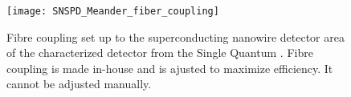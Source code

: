 \begin{figure}[H]
    \centering
    \texttt{[image: SNSPD\_Meander\_fiber\_coupling]}
    \caption{Fibre coupling set up to the superconducting nanowire detector area of the characterized detector from the Single Quantum \cite{singlequantum_snsd}.
    Fibre coupling is made in-house and is ajusted to maximize efficiency. It cannot be adjusted manually.}
    \label{fig:SNSPD_fiber_coupling}
\end{figure}

